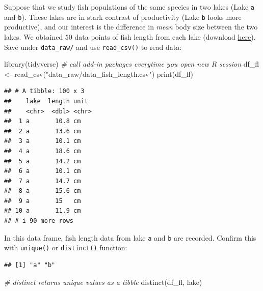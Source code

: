 \documentclass[
]{book}
\newenvironment{Shaded}{\begin{snugshade}}{\end{snugshade}}
\newcommand{\CommentTok}[1]{\textcolor[rgb]{0.56,0.35,0.01}{\textit{#1}}}
\newcommand{\FunctionTok}[1]{\textcolor[rgb]{0.00,0.00,0.00}{#1}}
\newcommand{\NormalTok}[1]{#1}
\newcommand{\OtherTok}[1]{\textcolor[rgb]{0.56,0.35,0.01}{#1}}
\newcommand{\SpecialCharTok}[1]{\textcolor[rgb]{0.00,0.00,0.00}{#1}}
\newcommand{\StringTok}[1]{\textcolor[rgb]{0.31,0.60,0.02}{#1}}
\begin{document}
Suppose that we study fish populations of the same species in two lakes (Lake \texttt{a} and \texttt{b}). These lakes are in stark contrast of productivity (Lake \texttt{b} looks more productive), and our interest is the difference in \emph{mean} body size between the two lakes. We obtained \(50\) data points of fish length from each lake (download \href{https://github.com/aterui/biostats/blob/master/data_raw/data_fish_length.csv}{here}). Save under \texttt{data\_raw/} and use \texttt{read\_csv()} to read data:

\begin{Shaded}
\begin{Highlighting}[]
\FunctionTok{library}\NormalTok{(tidyverse) }\CommentTok{\# call add{-}in packages everytime you open new R session}
\NormalTok{df\_fl }\OtherTok{\textless{}{-}} \FunctionTok{read\_csv}\NormalTok{(}\StringTok{"data\_raw/data\_fish\_length.csv"}\NormalTok{)}
\FunctionTok{print}\NormalTok{(df\_fl)}
\end{Highlighting}
\end{Shaded}

\begin{verbatim}
## # A tibble: 100 x 3
##    lake  length unit 
##    <chr>  <dbl> <chr>
##  1 a       10.8 cm   
##  2 a       13.6 cm   
##  3 a       10.1 cm   
##  4 a       18.6 cm   
##  5 a       14.2 cm   
##  6 a       10.1 cm   
##  7 a       14.7 cm   
##  8 a       15.6 cm   
##  9 a       15   cm   
## 10 a       11.9 cm   
## # i 90 more rows
\end{verbatim}

In this data frame, fish length data from lake \texttt{a} and \texttt{b} are recorded. Confirm this with \texttt{unique()} or \texttt{distinct()} function:

\begin{Shaded}
\end{Shaded}

\begin{verbatim}
## [1] "a" "b"
\end{verbatim}

\begin{Shaded}
\begin{Highlighting}[]
\CommentTok{\# distinct returns unique values as a tibble}
\FunctionTok{distinct}\NormalTok{(df\_fl, lake)}
\end{Highlighting}
\end{Shaded}
\end{document}
